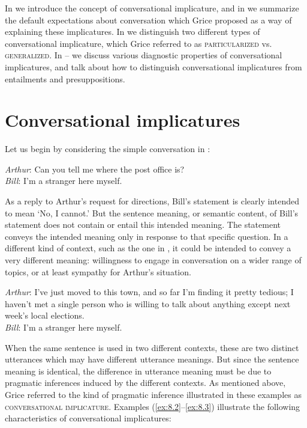 In  we introduce the concept of conversational implicature, and in  we summarize the default expectations about conversation which Grice proposed as a way of explaining these implicatures. In  we distinguish two different types of conversational implicature, which Grice referred to as \textsc{particularized} vs. \textsc{generalized}. In -- we discuss various diagnostic properties of conversational implicatures, and talk about how to distinguish conversational implicatures from entailments and presuppositions.


\section{Conversational implicatures}\label{sec:8.2}

Let us begin by considering the simple conversation in : 


\ea \label{ex:8.2}
\textit{Arthur}: Can you tell me where the post office is?\\
\textit{Bill}: I’m a stranger here myself.
\z


As a reply to Arthur’s request for directions, Bill’s statement is clearly intended to mean ‘No, I cannot.’ But the sentence meaning, or semantic content, of Bill’s statement does not contain or entail this intended meaning. The statement conveys the intended meaning only in response to that specific question. In a different kind of context, such as the one in , it could be intended to convey a very different meaning: willingness to engage in conversation on a wider range of topics, or at least sympathy for Arthur’s situation.


\ea \label{ex:8.3}
\textit{Arthur}: I’ve just moved to this town, and so far I’m finding it pretty tedious; I haven’t met a single person who is willing to talk about anything except next week’s local elections.\\
\textit{Bill}: I’m a stranger here myself.
\z


When the same sentence is used in two different contexts, these are two distinct utterances which may have different utterance meanings. But since the sentence meaning is identical, the difference in utterance meaning must be due to pragmatic inferences induced by the different contexts. As mentioned above, Grice referred to the kind of pragmatic inference illustrated in these examples as \textsc{conversational implicature}. Examples (\ref{ex:8.2}--\ref{ex:8.3}) illustrate the following characteristics of conversational implicatures:


